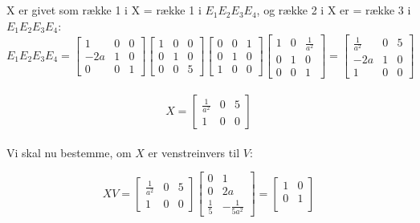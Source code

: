 \documentclass[a4paper,12pt]{article}
\begin{document}
\subsection{}
X er givet som række 1 i X = række 1 i $E_1 E_2 E_3 E_4$, og række 2 i X er = række 3 i $E_1 E_2 E_3 E_4$:\\
\[
E_1 E_2 E_3 E_4 = 
\left[\begin{array}{ccc}
    1 & 0 & 0 \\
    -2a & 1 & 0 \\
    0 & 0 & 1
\end{array}\right]
\left[\begin{array}{ccc}
    1 & 0 & 0 \\
    0 & 1 & 0 \\
    0 & 0 & 5
\end{array}\right]
\left[\begin{array}{ccc}
    0 & 0 & 1 \\
    0 & 1 & 0 \\
    1 & 0 & 0
\end{array}\right]
\left[\begin{array}{ccc}
    1 & 0 & \frac{1}{a^2} \\
    0 & 1 & 0 \\
    0 & 0 & 1
\end{array}\right]
=
\left[\begin{array}{ccc}
    \frac{1}{a^2} & 0 & 5 \\
    -2a & 1 & 0 \\
    1 & 0 & 0
\end{array}\right]
\]\\
\[
X =
\left[\begin{array}{ccc}
    \frac{1}{a^2} & 0 & 5 \\
    1 & 0 & 0
\end{array}\right]
\]\\

Vi skal nu bestemme, om $X$ er venstreinvers til $V$:

\[
XV = 
\left[\begin{array}{ccc}
    \frac{1}{a^2} & 0 & 5 \\
    1 & 0 & 0
\end{array}\right]
\left[\begin{array}{cc}
    0 & 1 \\
    0 & 2a \\
    \frac{1}{5} & -\frac{1}{5a^2}
\end{array}\right]
=
\left[\begin{array}{cc}
    1 & 0 \\
    0 & 1 \\
\end{array}\right]
\]
\end{document}
